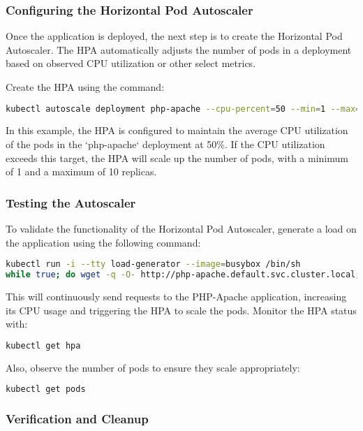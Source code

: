 \subsubsection{Configuring the Horizontal Pod Autoscaler}

Once the application is deployed, the next step is to create the Horizontal Pod Autoscaler. The HPA automatically adjusts the number of pods in a deployment based on observed CPU utilization or other select metrics.

Create the HPA using the command:

\begin{lstlisting}[language=bash]
kubectl autoscale deployment php-apache --cpu-percent=50 --min=1 --max=10
\end{lstlisting}

In this example, the HPA is configured to maintain the average CPU utilization of the pods in the `php-apache` deployment at 50\%. If the CPU utilization exceeds this target, the HPA will scale up the number of pods, with a minimum of 1 and a maximum of 10 replicas.

\subsubsection{Testing the Autoscaler}

To validate the functionality of the Horizontal Pod Autoscaler, generate a load on the application using the following command:

\begin{lstlisting}[language=bash]
kubectl run -i --tty load-generator --image=busybox /bin/sh
while true; do wget -q -O- http://php-apache.default.svc.cluster.local; done
\end{lstlisting}

This will continuously send requests to the PHP-Apache application, increasing its CPU usage and triggering the HPA to scale the pods. Monitor the HPA status with:

\begin{lstlisting}[language=bash]
kubectl get hpa
\end{lstlisting}

Also, observe the number of pods to ensure they scale appropriately:

\begin{lstlisting}[language=bash]
kubectl get pods
\end{lstlisting}

\subsubsection{Verification and Cleanup}


